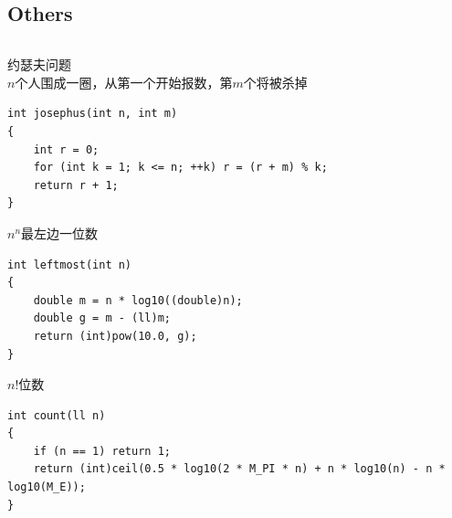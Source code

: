 \documentclass[twoside]{article}
\begin{document}
\subsection{Others}
\begin{lstlisting}
\end{lstlisting}
约瑟夫问题\\
$n$个人围成一圈，从第一个开始报数，第$m$个将被杀掉
\begin{lstlisting}
int josephus(int n, int m)
{
    int r = 0;
    for (int k = 1; k <= n; ++k) r = (r + m) % k;
    return r + 1;
}
\end{lstlisting}
$n^n$最左边一位数
\begin{lstlisting}
int leftmost(int n)
{
    double m = n * log10((double)n);
    double g = m - (ll)m;
    return (int)pow(10.0, g);
}
\end{lstlisting}
$n!$位数
\begin{lstlisting}
int count(ll n)
{
    if (n == 1) return 1;
    return (int)ceil(0.5 * log10(2 * M_PI * n) + n * log10(n) - n * log10(M_E));
}
\end{lstlisting}
\end{document}
